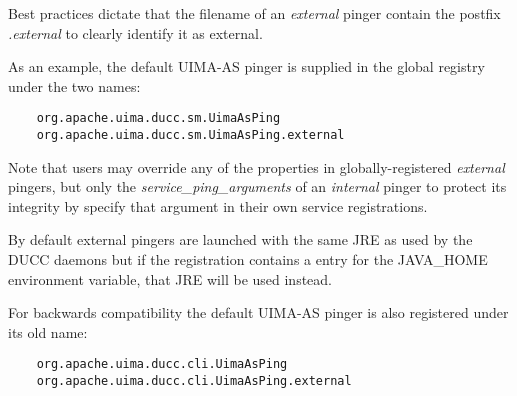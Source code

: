     Best practices dictate that the filename of an {\em external} pinger contain the
    postfix {\em .external} to clearly identify it as external.  

    As an example, the default UIMA-AS pinger is supplied in the global registry
    under the two names:
\begin{verbatim}
    org.apache.uima.ducc.sm.UimaAsPing
    org.apache.uima.ducc.sm.UimaAsPing.external
\end{verbatim}

    Note that users may override any of the properties in globally-registered
    {\em external} pingers, but only the {\em service\_ping\_arguments} of an {\em internal}
    pinger to protect its integrity by specify that argument in their own
    service registrations.

    By default external pingers are launched with the same JRE as used by the DUCC daemons but if the
    registration contains a entry for the JAVA\_HOME environment variable, that JRE will be used instead.

    For backwards compatibility the default UIMA-AS pinger is also registered under its old name:
\begin{verbatim}
    org.apache.uima.ducc.cli.UimaAsPing
    org.apache.uima.ducc.cli.UimaAsPing.external
\end{verbatim}
